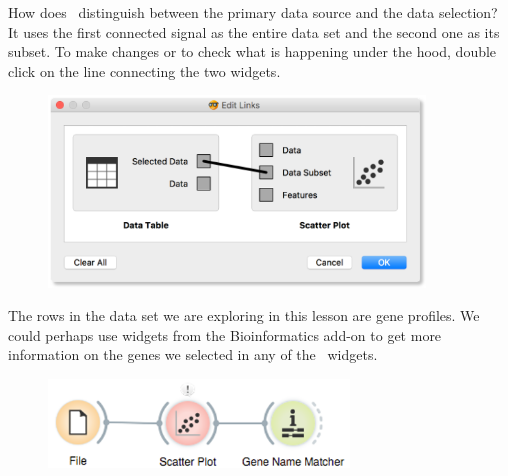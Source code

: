 How does \mutation\  distinguish between the primary data source and the data selection? It uses the first connected signal as the entire data set and the second one as its subset. To make changes or to check what is happening under the hood, double click on the line connecting the two widgets.
\newpage


\begin{figure}[h]
  \flushright
  \includegraphics[width=100mm]{workflow-fig6.png}
\label{fig:workflow-fig6}%
\end{figure}

The rows in the data set we are exploring in this lesson are gene profiles. We could perhaps use widgets from the Bioinformatics add-on to get more information on the genes we selected in any of the \mutation\ widgets.

\begin{figure}[h]
  \flushright
  \includegraphics[width=80mm]{workflow-fig7.png}%
\label{fig:workflow-fig7}%
\end{figure}

